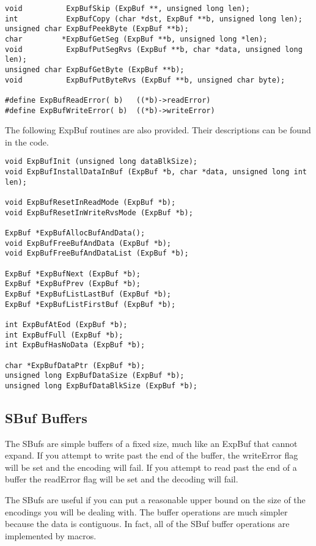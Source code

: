 \begin{verbatim}
void          ExpBufSkip (ExpBuf **, unsigned long len);
int           ExpBufCopy (char *dst, ExpBuf **b, unsigned long len);
unsigned char ExpBufPeekByte (ExpBuf **b);
char         *ExpBufGetSeg (ExpBuf **b, unsigned long *len);
void          ExpBufPutSegRvs (ExpBuf **b, char *data, unsigned long len);
unsigned char ExpBufGetByte (ExpBuf **b);
void          ExpBufPutByteRvs (ExpBuf **b, unsigned char byte);

#define ExpBufReadError( b)   ((*b)->readError)
#define ExpBufWriteError( b)  ((*b)->writeError)
\end{verbatim}


The following {\C ExpBuf} routines are also provided.  Their
descriptions can be found in the code.
\begin{verbatim}
void ExpBufInit (unsigned long dataBlkSize);
void ExpBufInstallDataInBuf (ExpBuf *b, char *data, unsigned long int len);

void ExpBufResetInReadMode (ExpBuf *b);
void ExpBufResetInWriteRvsMode (ExpBuf *b);

ExpBuf *ExpBufAllocBufAndData();
void ExpBufFreeBufAndData (ExpBuf *b);
void ExpBufFreeBufAndDataList (ExpBuf *b);

ExpBuf *ExpBufNext (ExpBuf *b);
ExpBuf *ExpBufPrev (ExpBuf *b);
ExpBuf *ExpBufListLastBuf (ExpBuf *b);
ExpBuf *ExpBufListFirstBuf (ExpBuf *b);

int ExpBufAtEod (ExpBuf *b);
int ExpBufFull (ExpBuf *b);
int ExpBufHasNoData (ExpBuf *b);

char *ExpBufDataPtr (ExpBuf *b);
unsigned long ExpBufDataSize (ExpBuf *b);
unsigned long ExpBufDataBlkSize (ExpBuf *b);
\end{verbatim}

\subsection{SBuf Buffers}

The {\C SBuf}s are simple buffers of a fixed size, much like an
{\C ExpBuf} that cannot expand.  If you attempt to write
past the end of the buffer, the writeError flag will be set and the
encoding will fail.  If you attempt to read past the end of a buffer
the readError flag will be set and the decoding will fail.

The {\C SBuf}s are useful if you can put a reasonable upper bound on
the size of the encodings you will be dealing with.  The buffer
operations are much simpler because the data is contiguous.  In fact,
all of the {\C SBuf} buffer operations are implemented by macros.

